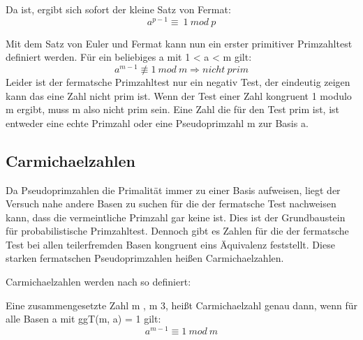 	Da 	 ist, ergibt sich sofort der kleine Satz von Fermat:
	\begin{displaymath}
		a^{p-1} \equiv~1~mod~p
	\end{displaymath}
		
	Mit dem Satz von Euler und Fermat kann nun ein erster primitiver Primzahltest definiert werden.  
	Für ein beliebiges 	a \myin {} mit 1 < a < m gilt:
	\begin{displaymath}
		a^{m-1} \not\equiv 1~mod~m \Longrightarrow nicht~prim
	\end{displaymath}
	Leider ist der fermatsche Primzahltest nur ein negativ Test, der eindeutig zeigen kann das eine Zahl nicht prim ist. Wenn der Test einer Zahl kongruent 1 modulo m ergibt, muss m also nicht prim sein. Eine Zahl die für den Test prim ist, ist entweder eine echte Primzahl oder eine Pseudoprimzahl m zur Basis a.\cite{Elementare:Zahlentheorie}
		
	\subsection{Carmichaelzahlen}
	Da Pseudoprimzahlen die Primalität immer zu einer Basis aufweisen, liegt der Versuch nahe andere Basen zu suchen für die der fermatsche Test nachweisen kann, dass die vermeintliche Primzahl gar keine ist. Dies ist der Grundbaustein für probabilistische Primzahltest. Dennoch gibt es Zahlen für die der fermatsche Test bei allen teilerfremden Basen kongruent eins Äquivalenz feststellt. Diese starken fermatschen Pseudoprimzahlen heißen Carmichaelzahlen.
	
	Carmichaelzahlen werden nach \cite{Algebraische:und:zahlentheoretische:Grundlagen:fuer:die:Informatik} so definiert:
	
	Eine zusammengesetzte Zahl m \myin {}, m \myMathRM{\geq} 3, heißt Carmichaelzahl genau dann, wenn für alle Basen a mit ggT(m, a) = 1 gilt: 
	\begin{displaymath}
		a^{m-1} \equiv 1~mod~m
	\end{displaymath}
